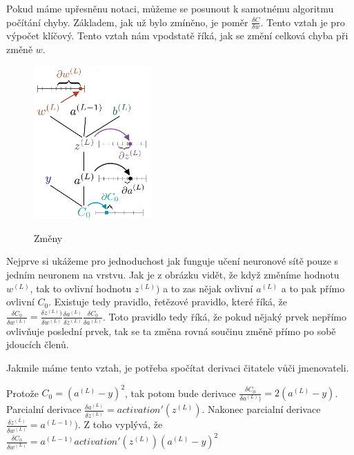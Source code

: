 Pokud máme upřesněnu notaci, můžeme se posunout k samotnému algoritmu počítání chyby.
Základem, jak už bylo zmíněno, je poměr \(\frac{\delta C}{\delta w}\). Tento vztah je pro výpočet klíčový.
Tento vztah nám vpodstatě říká, jak se změní celková chyba při změně \(w\).

\begin{figure}[h]
    \centering
    \includegraphics[width=0.4\textwidth]{images/delta.png}
    \caption{Změny} \cite{delta}
\end{figure}

Nejprve si ukážeme pro jednoduchost jak funguje učení neuronové sítě pouze s jedním neuronem na vrstvu. Jak je z obrázku vidět, že když změníme hodnotu \(w^{(L)}\), tak to ovlivní hodnotu \(z^{(L)})\) a to zas nějak ovlivní \(a^{(L)}\) a to pak přímo ovlivní \(C_0\).
Existuje tedy pravidlo, řetězové pravidlo\cite{chain_rule}, které říká, že \(\frac{\delta C_0}{\delta w^{(L)}} = \frac{\delta z^{(L)})}{\delta w^{(L)}}\frac{\delta a^{(L)}}{\delta z^{(L)}}\frac{\delta C_0}{\delta a^{(L)}}\).
Toto pravidlo tedy říká, že pokud nějaký prvek nepřímo ovlivňuje poslední prvek, tak se ta změna rovná součinu změně přímo po sobě jdoucích členů.

Jakmile máme tento vztah, je potřeba spočítat derivaci čitatele vůči jmenovateli.

Protože \(C_0 = (a^{(L)} - y)^2\), tak potom bude derivace \(\frac{\delta C_0}{\delta a^{(L)})}= 2(a^{(L)} - y)\).
Parcialní derivace \(\frac{\delta a^{(L)}}{\delta z^{(L)}} = activation'(z^{(L)}) \).
Nakonec parcialní derivace \(\frac{\delta z^{(L)}}{\delta w^{(L)}} = a^{(L-1)})\).
Z toho vyplývá, že \(\frac{\delta C_0}{\delta w^{(L)}} = a^{(L-1)} activation'(z^{(L)}) (a^{(L)} - y)^2\)